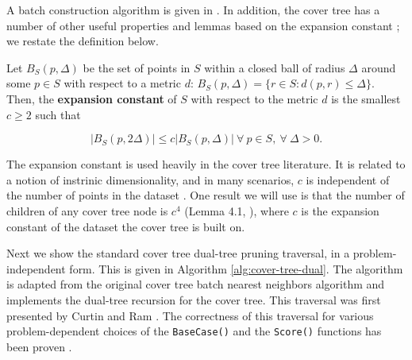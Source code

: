 A batch construction algorithm is given in \cite{langford2006}.  In addition,
the cover tree has a number of other useful properties and lemmas based on the
expansion constant \cite{karger2002finding}; we restate the definition below.

\begin{defn}
\label{def:int_dim}
Let $B_S(p, \Delta)$ be the set of points in $S$ within a closed ball of radius
$\Delta$ around some $p \in S$ with respect to a metric $d$:
%
$B_S(p, \Delta) = \{ r \in S \colon d(p, r) \leq \Delta \}$.
%
Then, the {\bf expansion constant} of $S$ with respect to the metric $d$ is the
smallest $c \ge 2$ such that

\begin{equation}
| B_S(p, 2 \Delta) | \le c | B_S(p, \Delta) |\ \forall\ p \in S,\
\forall\ \Delta > 0.
\end{equation}

\end{defn}

The expansion constant is used heavily in the cover tree literature.  It is
related to a notion of instrinic dimensionality, and in many scenarios, $c$ is
independent of the number of points in the dataset \cite{langford2006,
karger2002finding}.
One result we will use is that
the number of children of any cover tree node is $c^4$ (Lemma 4.1,
\cite{langford2006}), where $c$ is the expansion constant of the dataset the
cover tree is built on.



Next we show the standard cover tree dual-tree pruning traversal, in a
problem-independent form.  This is given in Algorithm \ref{alg:cover-tree-dual}.
The algorithm is adapted from the original cover tree batch nearest neighbors
algorithm \cite{langford2006} and implements the dual-tree recursion for the
cover tree.  This traversal was first presented by Curtin and Ram
\cite{curtin2014dual}.
%
The correctness of this
traversal for various problem-dependent choices of the \texttt{BaseCase()} and
the \texttt{Score()} functions has been proven \cite{curtin2013tree}.


